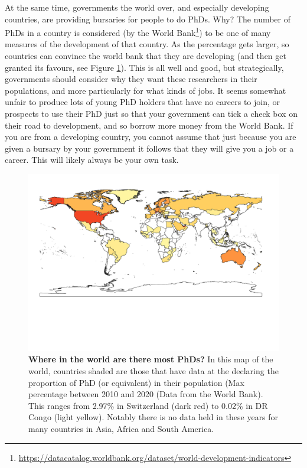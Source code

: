 \documentclass[
]{krantz}
\renewcommand{\href}[2]{#2\footnote{\url{#1}}}
\begin{document}
At the same time, governments the world over, and especially developing countries, are providing bursaries for people to do PhDs. Why? The number of PhDs in a country is considered (by the \href{https://datacatalog.worldbank.org/dataset/world-development-indicators}{World Bank}) to be one of many measures of the development of that country. As the percentage gets larger, so countries can convince the world bank that they are developing (and then get granted its favours, see Figure \ref{fig:PhDMap}). This is all well and good, but strategically, governments should consider why they want these researchers in their populations, and more particularly for what kinds of jobs. It seems somewhat unfair to produce lots of young PhD holders that have no careers to join, or prospects to use their PhD just so that your government can tick a check box on their road to development, and so borrow more money from the World Bank. If you are from a developing country, you cannot assume that just because you are given a bursary by your government it follows that they will give you a job or a career. This will likely always be your own task.



\begin{figure}

\includegraphics[width=0.95\linewidth]{figures/PhDMap} \hfill{}

\caption{\textbf{Where in the world are there most PhDs?} In this map of the world, countries shaded are those that have data at the declaring the proportion of PhD (or equivalent) in their population (Max percentage between 2010 and 2020 (Data from the World Bank). This ranges from 2.97\% in Switzerland (dark red) to 0.02\% in DR Congo (light yellow). Notably there is no data held in these years for many countries in Asia, Africa and South America.}\label{fig:PhDMap}
\end{figure}
\end{document}
